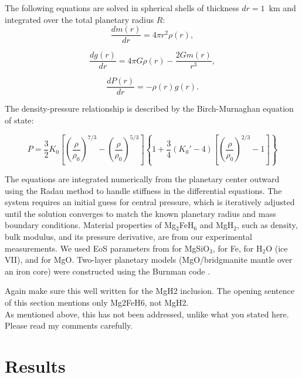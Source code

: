 \documentclass[draft,jgrga,12pt]{agujournal2019}
\begin{document}
The following equations are solved in spherical shells of thickness $dr = 1$~$\mathrm{km}$ and integrated over the total planetary radius $R$:
\begin{equation}
    \frac{dm(r)}{dr} = 4\pi r^2\rho (r),
\end{equation}

\begin{equation}
    \frac{dg(r)}{dr} = 4 \pi G\rho (r) -\frac{2Gm(r)}{r^3},
\end{equation}

\begin{equation}
    \frac{dP(r)}{dr} = -\rho (r) g (r).
\end{equation}
    
The density-pressure relationship is described by the Birch-Murnaghan equation of state:

\begin{equation}
P = \frac{3}{2}K_0\left[\left(\frac{\rho}{\rho_0}\right)^{7/3} - \left(\frac{\rho}{\rho_0}\right)^{5/3}\right]\left\{1 + \frac{3}{4}(K_0' - 4)\left[\left(\frac{\rho}{\rho_0}\right)^{2/3} - 1\right]\right\}
\end{equation}

The equations are integrated numerically from the planetary center outward using the Radau method \cite{butcher_coefficients_1963} to handle stiffness in the differential equations. 
The system requires an initial guess for central pressure, which is iteratively adjusted until the solution converges to match the known planetary radius and mass boundary conditions. 
Material properties of Mg$_2$FeH$_6$ and MgH$_2$, such as density, bulk modulus, and its pressure derivative, are from our experimental measurements.
We used EoS parameters from  for MgSiO$_3$,  for Fe,  for H$_2$O (ice VII), and  for MgO. Two-layer planetary models (MgO/bridgmanite mantle over an iron core) were constructed using the Burnman code \cite{myhill_burnman_2023}.
\begin{cbox}
Again make sure this well written for the MgH2 inclusion.  The opening sentence of this section mentions only Mg2FeH6, not MgH2. 
\\
As mentioned above, this has not been addressed, unlike what you stated here. Please read my comments carefully.\XWrevised
\end{cbox}


\section{Results}
\end{document}
